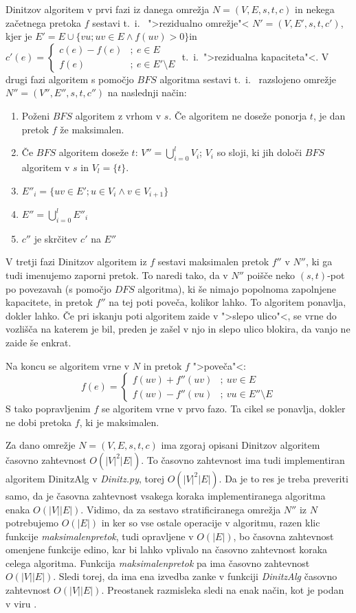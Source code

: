 \documentclass[a4paper, 10pt]{article}
\newcommand{\abs}[1]{\ensuremath{\lvert #1 \rvert}}
\begin{document}
	Dinitzov algoritem v prvi fazi iz danega omrežja $N = (V, E, s, t, c)$ in nekega začetnega pretoka $f$ sestavi t.~i.~ ">rezidualno omrežje"< $N' = (V, E', s, t, c')$, kjer je $E' = E \cup \{vu; uv\in E \land f(uv) > 0\}$in $c'(e) = \begin{cases}
		c(e) - f(e) &;~e\in E \\
		f(e) &;~e\in E'\setminus E
	\end{cases}$ t.~i.~">rezidualna kapaciteta"<. V drugi fazi algoritem s pomočjo $BFS$ algoritma sestavi t.~i.~ razslojeno omrežje $N'' = (V'', E'', s, t, c'')$ na naslednji način:
	\begin{enumerate}
		\item Poženi $BFS$ algoritem z vrhom v $s$. Če algoritem ne doseže ponorja $t$, je dan pretok $f$ že maksimalen.
		\item Če $BFS$ algoritem doseže $t$: $V'' = \bigcup_{i = 0}^{l} V_i$; $V_i$ so sloji, ki jih določi $BFS$ algoritem v $s$ in $V_l = \{t\}$.
		\item $E''_i = \{uv\in E'; u\in V_i \land v\in V_{i+1}\}$
		\item $E'' = \bigcup_{i = 0}^{l} E''_i$
		\item $c''$ je skrčitev $c'$ na $E''$
	\end{enumerate}
	V tretji fazi Dinitzov algoritem iz $f$ sestavi maksimalen pretok $f''$ v $N''$, ki ga tudi imenujemo zaporni pretok. To naredi tako, da v $N''$ poišče neko $(s, t)$-pot po povezavah (s pomočjo $DFS$ algoritma), ki še nimajo popolnoma zapolnjene kapacitete, in pretok $f''$ na tej poti poveča, kolikor lahko. To algoritem ponavlja, dokler lahko. Če pri iskanju poti algoritem zaide v ">slepo ulico"<, se vrne do vozlišča na katerem je bil, preden je zašel v njo in slepo ulico blokira, da vanjo ne zaide še enkrat.
	
	Na koncu se algoritem vrne v $N$ in pretok $f$ ">poveča"<: \[f(e) = \begin{cases}
		f(uv) + f''(uv)&;~ uv\in E \\
		f(uv) - f''(vu)&;~ vu \in E''\setminus E
	\end{cases}\] S tako popravljenim $f$ se algoritem vrne v prvo fazo. Ta cikel se ponavlja, dokler ne dobi pretoka $f$, ki je maksimalen.
	
	Za dano omrežje $N = (V, E, s, t, c)$ ima zgoraj opisani Dinitzov algoritem časovno zahtevnost $O(\abs{V}^2\abs{E})$. To časovno zahtevnost ima tudi implementiran algoritem DinitzAlg v \textit{Dinitz.py}, torej $O(\abs{V}^2\abs{E})$. Da je to res je treba preveriti samo, da je časovna zahtevnost vsakega koraka implementiranega algoritma enaka $O(\abs{V}\abs{E})$.
	Vidimo, da za sestavo stratificiranega omrežja $N''$ iz $N$ potrebujemo $O(\abs{E})$ in ker so vse ostale operacije v algoritmu, razen klic funkcije \textit{maksimalenpretok}, tudi opravljene v $O(\abs{E})$, bo časovna zahtevnost omenjene funkcije edino, kar bi lahko vplivalo na časovno zahtevnost koraka celega algoritma. Funkcija \textit{maksimalenpretok} pa ima časovno zahtevnost $O(\abs{V}\abs{E})$. Sledi torej, da ima ena izvedba zanke v funkciji \textit{DinitzAlg} časovno zahtevnost $O(\abs{V}\abs{E})$. Preostanek razmisleka sledi na enak način, kot je podan v viru \cite{bib:even}.
	
\end{document}
